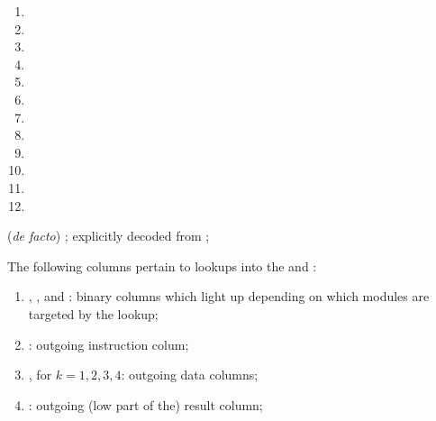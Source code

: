 \begin{enumerate}
\begin{multicols}{3}
\begin{enumerate}
				\item \oobInstIsModexpLead{}
				\item \oobInstIsModexpPricing{}
				\item \oobInstIsModexpExtract{}
				\item \oobInstIsPointEvaluation{}
				\item \oobInstIsBlsGOneAdd{}
				\item \oobInstIsBlsGOneMsm{}
				\item \oobInstIsBlsGTwoAdd{}
				\item \oobInstIsBlsGTwoMsm{}
				\item \oobInstIsBlsPairingCheck{}
				\item \oobInstIsBlsMapFpToGOne{}
				\item \oobInstIsBlsMapFpTwoToGTwo{}
				\item[\vspace{\fill}]
			\end{enumerate}
		\end{multicols}
		(\emph{de facto}) \ccbc{}; explicitly decoded from ;
\end{enumerate}
The following columns pertain to lookups into the \wcpMod{} and \addMod{}:
\begin{enumerate}[resume]
	\item
		\wcpFlag{},
		\addFlag{},
		\modFlag{} and
		\blsRefTableFlag{}:
		binary columns which light up depending on which modules are targeted by the lookup;
	\item \outgoingInst{}:
		outgoing instruction colum;
	\item {}, for $k = 1, 2, 3, 4$:
		outgoing data columns;
	\item \outgoingResLo{}:
		outgoing (low part of the) result column;
\end{enumerate}
